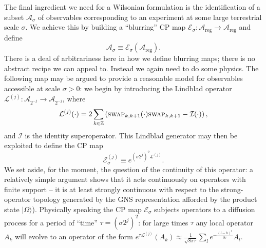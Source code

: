 \documentclass[11pt]{amsart}
\theoremstyle{plain}%
\theoremstyle{definition}
\theoremstyle{remark}
\begin{document}
The final ingredient we need for a Wilsonian formulation is the identification of a subset $\mathcal{A}_\sigma$ of observables corresponding to an experiment at some large terrestrial scale $\sigma$. We achieve this by building a ``blurring'' CP map $\mathcal{E}_{\sigma}:\mathcal{A}_{\text{reg}}\rightarrow \mathcal{A}_{\text{reg}}$ and define 
\begin{equation}
	\mathcal{A}_\sigma \equiv \mathcal{E}_{\sigma}(\mathcal{A}_{\text{reg}}).
\end{equation}
There is a deal of arbitrariness here in how we define blurring maps; there is no abstract recipe we can appeal to. Instead we again need to do some physics. The following map may be argued to provide a reasonable model for observables accessible at scale $\sigma > 0$: we begin by introducing the Lindblad operator $\mathcal{L}^{(j)}:\mathcal{A}_{2^{-j}} \rightarrow \mathcal{A}_{2^{-j}}$, where
\begin{equation}
	\mathcal{L}^{(j)}(\cdot) = 2\sum_{k\in \mathbb{Z}} \left(\textsc{swap}_{k,k+1}(\cdot)\textsc{swap}_{k,k+1} - \mathcal{I}(\cdot)\right),
\end{equation}
and $\mathcal{I}$ is the identity superoperator. This Lindblad generator may then be exploited to define the CP map
\begin{equation}
	\mathcal{E}_\sigma^{(j)} \equiv e^{(\sigma 2^{j})^2\mathcal{L}^{(j)}}.
\end{equation} 
We set aside, for the moment, the question of the continuity of this operator: a relatively simple argument shows that it acts continuously on operators with finite support -- it is at least strongly continuous with respect to the strong-operator topology generated by the GNS representation afforded by the product state $|\Omega\rangle$). Physically speaking the CP map $\mathcal{E}_{\sigma}$ subjects operators to a diffusion process for a period of ``time'' $\tau = (\sigma 2^{j})^2$: for large times $\tau$ any local operator $A_k$ will evolve to an operator of the form $e^{\tau\mathcal{L}^{(j)}}(A_k) \approx \frac{1}{\sqrt{8\pi \tau}}\sum_l e^{-\frac{(l-k)^2}{8\tau}} A_l$.
\end{document}
